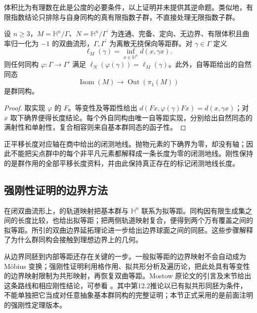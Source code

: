 体积比为有理数在此是公度的必要条件，以上证明并未提供其逆命题。类似地，有限指数结论只排除与自身同构的真有限指数子群，不直接处理无限指数子群。

\begin{proposition}\label{g3:prop:D-marked-length-rigidity}
	设 \(n\ge3\)，\(M=\mathbb H^n/\Gamma\)、\(N=\mathbb H^n/\Gamma^\prime\) 为连通、完备、定向、无边界、有限体积且曲率归一化为 \(-1\) 的双曲流形，\(\Gamma,\Gamma^\prime\) 为离散无挠保向等距群。对 \(\gamma\in\Gamma\) 定义
	\[
		\ell_M(\gamma)=\inf_{x\in\mathbb H^n}d(x,\gamma x).
	\]
	则任何同构 \(\varphi:\Gamma\to\Gamma'\) 满足
	\(\ell_N(\varphi(\gamma))=\ell_M(\gamma)\)。此外，自等距给出的自然同态
	\[
		\operatorname{Isom}(M)\longrightarrow
		\operatorname{Out}(\pi_1(M))
	\]
	是群同构。
\end{proposition}
\begin{proof}
	取实现 \(\varphi\) 的 \(F\)。等变性及等距性给出
	\(d(Fx,\varphi(\gamma)Fx)=d(x,\gamma x)\)；对 \(x\) 取下确界便得长度结论。每个外自同构由唯一自等距实现，分别给出自然同态的满射性和单射性，复合相容则来自基本群同态的函子性。
\end{proof}

正平移长度对应轴在商中给出的闭测地线。抛物元素的下确界为零，却没有轴；因此不能把尖点群中的每个非平凡元素都解释成一条长度为零的闭测地线。刚性保持的是群作用的全部平移长度资料，并由此保持真正存在的标记闭测地线长度。

\subsection{强刚性证明的边界方法}
\label{g3:subsec:D05:06}

在闭双曲流形上，的轨道映射把基本群与 \(\mathbb H^n\) 联系为拟等距。同构因有限生成集之间的长度比较，也给出拟等距；把两侧轨道映射复合，便得到两个万有覆盖之间的拟等距。所引的双曲边界延拓理论进一步给出边界球面之间的同胚。这些步骤解释了为什么群同构会接触到理想边界上的几何。

\ProseParagraphBreak
从边界同胚到内部等距还存在关键的一步。一般拟等距的边界映射不会自动成为 Möbius 变换；强刚性证明利用格作用、拟共形分析及遍历论，把此处具有等变性的边界映射限制为共形映射，再恢复双曲等距。Mostow 原论文的引言及末节给出这条路线和相应刚性结论，可参看 \cite[第53--55、102--104页]{Mostow1968HyperbolicRigidity}。其中第12.2推论以已有拟共形同胚为条件，不能单独把它当成对任意抽象基本群同构的完整证明；本节正式采用的是前面注明的强刚性定理版本。

